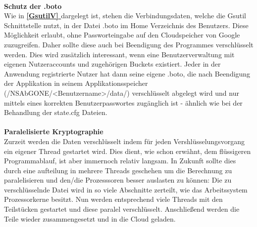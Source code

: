 \documentclass[13pt,a4paper,bibliography=totocnumbered,listof=totocnumbered]{scrartcl}
\newcommand*{\fullref}[1]{\textbf{\hyperref[{#1}]{\ref*{#1} \nameref*{#1}}}}
\begin{document}
\\\textbf{Schutz der .boto}\\
Wie in \fullref{GsutilV} dargelegt ist, stehen die Verbindungsdaten, welche die Gsutil Schnittstelle nutzt, in der Datei .boto im Home Verzeichnis des Benutzers. Diese Möglichkeit erlaubt, ohne Passworteingabe auf den Cloudspeicher von Google zuzugreifen. Daher sollte diese auch bei Beendigung des Programmes verschlüsselt werden. Dies wird zusätzlich interessant, wenn eine Benutzerverwaltung mit eigenen Nutzeraccounts und zugehörigen Buckets existiert. Jeder in der Anwendung registrierte Nutzer hat dann seine eigene .boto, die nach Beendigung der Applikation in seinem Applikationsspeicher (/NSAbGONE/\textless Benutzername\textgreater /data/) verschlüsselt abgelegt wird und nur mittels eines korrekten Benutzerpasswortes zugänglich ist - ähnlich wie bei der Behandlung der state.cfg Dateien.\\
\\\textbf{Paralelisierte Kryptographie}\\
Zurzeit werden die Daten verschlüsselt indem für jeden Vershlüsselungsvorgang ein eigener Thread gestartet wird. Dies dient, wie schon erwähnt, dem flüssigeren Programmablauf, ist aber immernoch relativ langsam. In Zukunft sollte dies durch eine aufteilung in mehrere Threads geschehen um die Berechnung zu paralelisieren und den/die Prozesssoren besser auslasten zu können: Die zu verschlüsselnde Datei wird in so viele Abschnitte zerteilt, wie das Arbeitssystem Prozessorkerne besitzt. Nun werden entsprechend viele Threads mit den Teilstücken gestartet und diese paralel verschlüsselt. Anschließend werden die Teile wieder zusammengesetzt und in die Cloud geladen.
\end{document}
